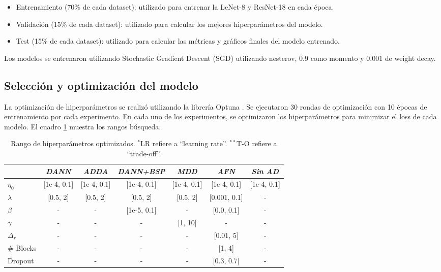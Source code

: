 \begin{itemize}
    \item Entrenamiento (70\% de cada dataset): utilizado para entrenar la LeNet-8 y ResNet-18 en cada época.
    \item Validación (15\% de cada dataset): utilizado para calcular los mejores hiperparámetros del modelo.
    \item Test (15\% de cada dataset): utilizado para calcular las métricas y gráficos finales del modelo entrenado.
\end{itemize}

Los modelos se entrenaron utilizando Stochastic Gradient Descent (SGD) \parencite{sutskever2013importance} utilizando nesterov, 0.9 como momento y 0.001 de weight decay.

\subsection{Selección y optimización del modelo}

La optimización de hiperparámetros se realizó utilizando la librería Optuna \parencite{optuna_2019}. Se ejecutaron 30 rondas de optimización con 10 épocas de entrenamiento por cada experimento. En
cada uno de los experimentos, se optimizaron los hiperparámetros para minimizar el loss de cada modelo. El cuadro
\ref{tab:rangos-hiperparametros} muestra los rangos búsqueda.

\begin{table}[H]
    \centering
    \begin{tabular}{l|cccccc}
        \toprule
                   & {\it DANN}  & {\it ADDA}  & {\it DANN+BSP} & {\it MDD}   & {\it AFN}    & {\it Sin AD} \\
        \midrule
        $\eta_0$   & [1e-4, 0.1] & [1e-4, 0.1] & [1e-4, 0.1]    & [1e-4, 0.1] & [1e-4, 0.1]  & [1e-4, 0.1]  \\
        $\lambda$  & [0.5, 2]    & [0.5, 2]    & [0.5, 2]       & [0.5, 2]    & [0.001, 0.1] & -            \\
        $\beta$    & -           & -           & [1e-5, 0.1]    & -           & [0.0, 0.1]   & -            \\
        $\gamma$   & -           & -           & -              & [1, 10]     & -            & -            \\
        $\Delta_r$ & -           & -           & -              & -           & [0.01, 5]    & -            \\
        \# Blocks  & -           & -           & -              & -           & [1, 4]       & -            \\
        Dropout    & -           & -           & -              & -           & [0.3, 0.7]   & -            \\
        \bottomrule
    \end{tabular}
    \caption[Rango de hiperparámetros optimizados]{Rango de hiperparámetros optimizados. $^{*}$LR refiere a ``learning rate''. $^{**}$T-O refiere a ``trade-off''.}
    \label{tab:rangos-hiperparametros}
\end{table}

